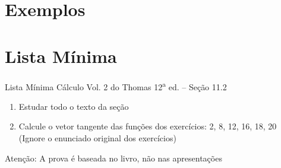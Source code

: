 
\section{Exemplos}



\section{Lista Mínima}

\begin{frame}{Lista Mínima}
  Cálculo Vol. 2 do Thomas 12\textsuperscript{a} ed. -- Seção 11.2
  \begin{enumerate}
    \item Estudar todo o texto da seção
    \item Calcule o vetor tangente das funções dos exercícios: 2, 8, 12, 16, 18, 20\\
          (Ignore o enunciado original dos exercícios)
  \end{enumerate}

  \vfill
  Atenção: A prova é baseada no livro, não nas apresentações
\end{frame}


